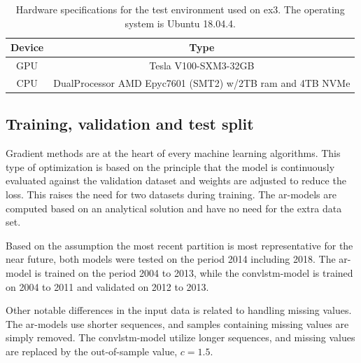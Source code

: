 \begin{table}[ht]
    \centering
    \begin{tabular}{c|c}
        Device &  Type  \\ \hline
        GPU & Tesla V100-SXM3-32GB \\
        CPU & DualProcessor AMD Epyc7601 (SMT2) w/2TB ram and 4TB NVMe 
    \end{tabular}
    \caption{Hardware specifications for the test environment used on \acrshort{ex3}. The operating system is Ubuntu 18.04.4.}
    \label{tab:hardware_ex3}
\end{table}


\subsection{Training, validation and test split}
Gradient methods are at the heart of every machine 
learning algorithms. This type of optimization is based on the principle that the model is continuously evaluated against the validation dataset and weights are adjusted to reduce the loss. This raises the need for two datasets during training. The \acrshort{ar}-models are computed based on an analytical solution and have no need for the extra data set. 

Based on the assumption the most recent partition is most representative for the near future, both models were tested on the period 2014 including 2018. The \acrshort{ar}-model is trained on the period 2004 to 2013, while the \acrshort{convlstm}-model is trained on 2004 to 2011 and validated on 2012 to 2013.

Other notable differences in the input data is related to handling missing values. The \acrshort{ar}-models use shorter sequences, and samples containing missing values are simply removed. The \acrshort{convlstm}-model utilize longer sequences, and missing values are replaced by the out-of-sample value, $c=1.5$. 

